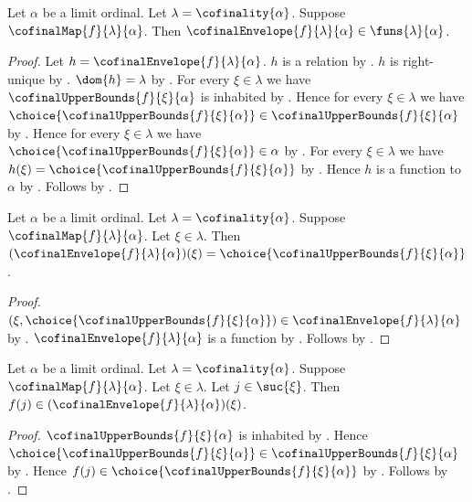 \begin{proposition}\label{cofinal_envelope_type}
    Let $\alpha$ be a limit ordinal.
    Let $\lambda=\cofinality{\alpha}$.
    Suppose $\cofinalMap{f}{\lambda}{\alpha}$.
    Then $\cofinalEnvelope{f}{\lambda}{\alpha}
        \in\funs{\lambda}{\alpha}$.
\end{proposition}
\begin{proof}
    Let $h=\cofinalEnvelope{f}{\lambda}{\alpha}$.
    $h$ is a relation by .
    $h$ is right-unique
        by .
    $\dom{h}=\lambda$
        by .
    For every $\xi\in\lambda$ we have
        $\cofinalUpperBounds{f}{\xi}{\alpha}$ is inhabited
        by .
    Hence for every $\xi\in\lambda$ we have
        $\choice{\cofinalUpperBounds{f}{\xi}{\alpha}}
            \in\cofinalUpperBounds{f}{\xi}{\alpha}$
        by .
    Hence for every $\xi\in\lambda$ we have
        $\choice{\cofinalUpperBounds{f}{\xi}{\alpha}}\in\alpha$
        by .
    For every $\xi\in\lambda$ we have
        $h(\xi)=\choice{\cofinalUpperBounds{f}{\xi}{\alpha}}$
        by .
    Hence $h$ is a function to $\alpha$ by \auto.
    Follows by .
\end{proof}

\begin{proposition}\label{cofinal_envelope_application}
    Let $\alpha$ be a limit ordinal.
    Let $\lambda=\cofinality{\alpha}$.
    Suppose $\cofinalMap{f}{\lambda}{\alpha}$.
    Let $\xi\in\lambda$.
    Then $(\cofinalEnvelope{f}{\lambda}{\alpha})(\xi)
        =\choice{\cofinalUpperBounds{f}{\xi}{\alpha}}$.
\end{proposition}
\begin{proof}
    $(\xi,\choice{\cofinalUpperBounds{f}{\xi}{\alpha}})
        \in\cofinalEnvelope{f}{\lambda}{\alpha}$
        by .
    $\cofinalEnvelope{f}{\lambda}{\alpha}$ is a function
        by .
    Follows by .
\end{proof}

\begin{proposition}\label{cofinal_envelope_dominates_prefix}
    Let $\alpha$ be a limit ordinal.
    Let $\lambda=\cofinality{\alpha}$.
    Suppose $\cofinalMap{f}{\lambda}{\alpha}$.
    Let $\xi\in\lambda$.
    Let $j\in\suc{\xi}$.
    Then $f(j)\in(\cofinalEnvelope{f}{\lambda}{\alpha})(\xi)$.
\end{proposition}
\begin{proof}
    $\cofinalUpperBounds{f}{\xi}{\alpha}$ is inhabited
        by .
    Hence $\choice{\cofinalUpperBounds{f}{\xi}{\alpha}}
        \in\cofinalUpperBounds{f}{\xi}{\alpha}$ by .
    Hence $f(j)\in\choice{\cofinalUpperBounds{f}{\xi}{\alpha}}$
        by .
    Follows by .
\end{proof}


